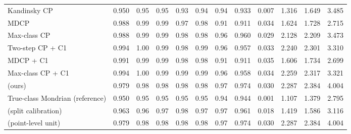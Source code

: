 \begin{table}[!htbp]
{\begin{tabular}{lccccccccccc}
Kandinsky CP & 0.950 & 0.95 & 0.95 & 0.93 & 0.94 & 0.94 & 0.933 & 0.007 & 1.316 & 1.649 & 3.485 \\
MDCP & 0.988 & 0.99 & 0.99 & 0.97 & 0.98 & 0.91 & 0.911 & 0.034 & 1.624 & 1.728 & 2.715 \\
Max-class CP & 0.988 & 0.99 & 0.99 & 0.98 & 0.98 & 0.96 & 0.960 & 0.029 & 2.128 & 2.209 & 3.473 \\
Two-step CP + C1 & 0.994 & 1.00 & 0.99 & 0.98 & 0.99 & 0.96 & 0.957 & 0.033 & 2.240 & 2.301 & 3.310 \\
MDCP + C1 & 0.991 & 0.99 & 0.99 & 0.98 & 0.98 & 0.91 & 0.911 & 0.035 & 1.606 & 1.734 & 2.699 \\
Max-class CP + C1 & 0.994 & 1.00 & 0.99 & 0.99 & 0.99 & 0.96 & 0.958 & 0.034 & 2.259 & 2.317 & 3.321 \\
\gamut{} (ours) & 0.979 & 0.98 & 0.98 & 0.98 & 0.98 & 0.97 & 0.974 & 0.030 & 2.287 & 2.384 & 4.004 \\
True-class Mondrian (reference) & 0.950 & 0.95 & 0.95 & 0.95 & 0.95 & 0.94 & 0.944 & 0.001 & 1.107 & 1.379 & 2.795 \\
\gamut{} (split calibration) & 0.963 & 0.96 & 0.97 & 0.98 & 0.97 & 0.97 & 0.961 & 0.018 & 1.419 & 1.586 & 3.116 \\
\gamut{} (point-level unit) & 0.979 & 0.98 & 0.98 & 0.98 & 0.98 & 0.97 & 0.974 & 0.030 & 2.287 & 2.384 & 4.004 \\
\bottomrule
\end{tabular}}
\end{table}
\FloatBarrier

